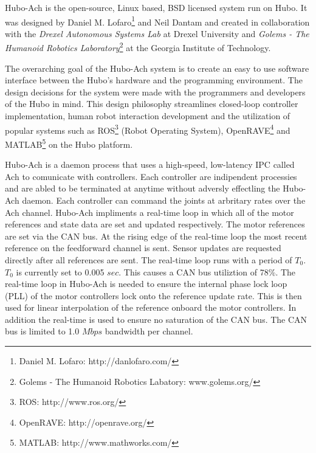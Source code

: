 Hubo-Ach is the open-source, Linux based, BSD licensed system run on Hubo.  
It was designed by Daniel M. Lofaro\footnote{Daniel M. Lofaro: http://danlofaro.com/} and Neil Dantam and created in collaboration with the \textit{Drexel Autonomous Systems Lab} at Drexel University and \textit{Golems - The Humanoid Robotics Laboratory}\footnote{Golems - The Humanoid Robotics Labatory: www.golems.org/} at the Georgia Institute of Technology.  

The overarching goal of the Hubo-Ach system is to create an easy to use software interface between the Hubo's hardware and the programming environment.  
The design decisions for the system were made with the programmers and developers of the Hubo in mind.
This design philosophy streamlines closed-loop controller implementation, human robot interaction development and the utilization of popular systems such as ROS\footnote{ROS: http://www.ros.org/} (Robot Operating System), OpenRAVE\footnote{OpenRAVE: http://openrave.org/} and MATLAB\footnote{MATLAB: http://www.mathworks.com/} on the Hubo platform.

Hubo-Ach is a daemon process that uses a high-speed, low-latency IPC called Ach \cite{ach} to comunicate with controllers.
Each controller are indipendent processies and are abled to be terminated at anytime without adversly effectling the Hubo-Ach daemon.
Each controller can command the joints at arbritary rates over the Ach channel.
Hubo-Ach impliments a real-time loop in which all of the motor references and state data are set and updated respectively.
The motor references are set via the CAN bus.
At the rising edge of the real-time loop the most recent reference on the feedforward channel is sent.
Sensor updates are requested directly after all references are sent.
The real-time loop runs with a period of $T_0$.
$T_0$ is currently set to 0.005 $sec$.
This causes a CAN bus utiliztion of 78\%.
The real-time loop in Hubo-Ach is needed to ensure the internal phase lock loop (PLL) of the motor controllers lock onto the reference update rate.
This is then used for linear interpolation of the reference onboard the motor controllers.
In addition the real-time is used to ensure no saturation of the CAN bus.
The CAN bus is limited to 1.0 $Mbps$ bandwidth per channel.




